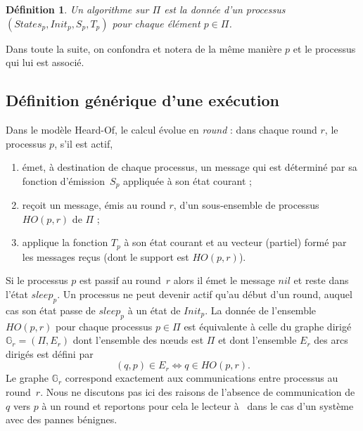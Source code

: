 \documentclass{article}
\newtheorem{definition}{Définition}
\begin{document}
\begin{definition}\label{def:algo}
Un algorithme  sur $\Pi$ est la donn\'ee d'un processus $(States_p, Init_p, S_p,T_p)$ pour chaque  \'el\'ement $p \in \Pi$.
\end{definition}
\noindent Dans toute la suite, on confondra et notera de la m\^eme mani\`ere $p$ et le processus qui lui est associ\'e.

\subsection{Définition générique d'une exécution}

Dans le mod\`ele Heard-Of, le calcul \'evolue en \emph{round} : dans chaque round $r$, 
	le processus $p$, s'il est actif,  
	\begin{enumerate}
	\item \'emet, \`a destination de chaque processus, un message qui est d\'etermin\'e par sa fonction d'\'emission~$S_p$  
		appliqu\'ee \`a son \'etat courant ;
	\item re\c{c}oit un message, \'emis au round $r$, d'un sous-ensemble de processus $HO(p,r)$ de $\Pi$ ;
        \item  applique la fonction  $T_p$ \`a son \'etat courant  et au vecteur (partiel) form\'e par les messages re\c{c}us (dont le support est 
         $HO(p,r)$).
	\end{enumerate}
Si le processus $p$ est passif au round~$r$ alors il \'emet le message $nil$ et reste dans l'\'etat $sleep_p$.
Un processus ne peut devenir actif qu'au d\'ebut d'un round, auquel cas son \'etat passe de $sleep_p$ \`a 
	un \'etat de $Init_p$.
La donn\'ee de l'ensemble $HO(p,r)$ pour chaque processus $p \in \Pi$ est \'equivalente \`a celle du graphe dirig\'e
	$\mathds{G}_r = (\Pi, E_r)$ dont l'ensemble des n\oe uds est $\Pi$ et dont l'ensemble $E_r$ des arcs dirig\'es 
	est d\'efini par
	$$ (q,p) \in E_r \Leftrightarrow q \in HO(p,r) .$$	
Le graphe $\mathds{G}_r $ correspond exactement aux communications entre processus au round~$r$.
Nous ne discutons pas ici des raisons de l'absence de communication de $q$ vers $p$ \`a un round et reportons pour cela  le lecteur 
	\`a~\cite{model_ho} dans le cas d'un syst\`eme avec des pannes b\'enignes.
\end{document}
